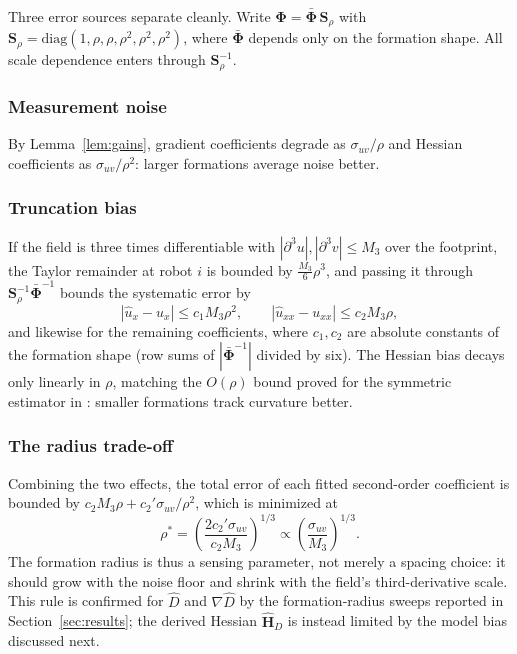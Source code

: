 \documentclass[lettersize,journal]{IEEEtran}
\begin{document}
Three error sources separate cleanly. Write $\boldsymbol{\Phi} =
\bar{\boldsymbol{\Phi}}\,\mathbf{S}_\rho$ with $\mathbf{S}_\rho =
\mathrm{diag}(1, \rho, \rho, \rho^2, \rho^2, \rho^2)$, where
$\bar{\boldsymbol{\Phi}}$ depends only on the formation shape. All
scale dependence enters through $\mathbf{S}_\rho^{-1}$.

\subsubsection{Measurement noise}
By Lemma~\ref{lem:gains}, gradient coefficients degrade as
$\sigma_{uv}/\rho$ and Hessian coefficients as $\sigma_{uv}/\rho^2$:
larger formations average noise better.

\subsubsection{Truncation bias}
If the field is three times differentiable with
$|\partial^3 u|, |\partial^3 v| \leq M_3$ over the footprint, the Taylor
remainder at robot $i$ is bounded by $\tfrac{M_3}{6}\rho^3$, and passing
it through $\mathbf{S}_\rho^{-1}\bar{\boldsymbol{\Phi}}^{-1}$ bounds the
systematic error by
\begin{equation}
    |\hat{u}_x - u_x| \leq c_1 M_3 \rho^2, \qquad
    |\hat{u}_{xx} - u_{xx}| \leq c_2 M_3 \rho,
    \label{eq:truncation}
\end{equation}
and likewise for the remaining coefficients, where $c_1, c_2$ are
absolute constants of the formation shape (row sums of
$|\bar{\boldsymbol{\Phi}}^{-1}|$ divided by six). The Hessian bias decays
only linearly in $\rho$, matching the $O(\rho)$ bound proved for the
symmetric estimator in \cite{15}: smaller formations track curvature better.

\subsubsection{The radius trade-off}
Combining the two effects, the total error of each fitted second-order
coefficient is bounded by
$c_2 M_3 \rho + c_2' \sigma_{uv}/\rho^2$, which is minimized at
\begin{equation}
    \rho^* = \left(\frac{2 c_2' \sigma_{uv}}{c_2 M_3}\right)^{1/3}
    \propto \left(\frac{\sigma_{uv}}{M_3}\right)^{1/3}.
    \label{eq:rho_star}
\end{equation}
The formation radius is thus a sensing parameter, not merely a spacing
choice: it should grow with the noise floor and shrink with the field's
third-derivative scale. This rule is confirmed for $\hat{D}$ and
$\nabla\hat{D}$ by the formation-radius sweeps reported in
Section~\ref{sec:results}; the derived Hessian $\hat{\mathbf{H}}_D$ is
instead limited by the model bias discussed next.
\end{document}
